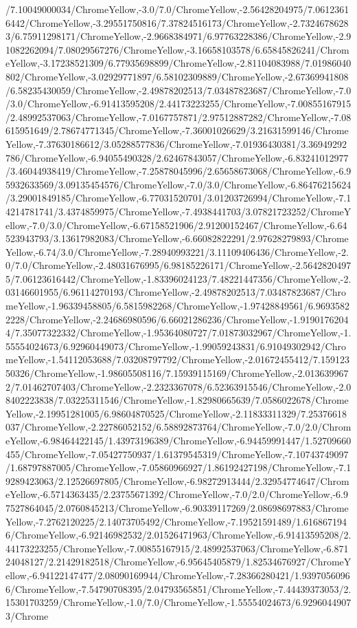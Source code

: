 {\begin{tikzternal}
/7.10049000034/ChromeYellow,-3.0/7.0/ChromeYellow,-2.56428204975/7.06123616442/ChromeYellow,-3.29551750816/7.37824516173/ChromeYellow,-2.73246786283/6.75911298171/ChromeYellow,-2.9668384971/6.97763228386/ChromeYellow,-2.91082262094/7.08029567276/ChromeYellow,-3.16658103578/6.65845826241/ChromeYellow,-3.17238521309/6.77935698899/ChromeYellow,-2.81104083988/7.01986040802/ChromeYellow,-3.02929771897/6.58102309889/ChromeYellow,-2.67369941808/6.58235430059/ChromeYellow,-2.49878202513/7.03487823687/ChromeYellow,-7.0/3.0/ChromeYellow,-6.91413595208/2.44173223255/ChromeYellow,-7.00855167915/2.48992537063/ChromeYellow,-7.0167757871/2.97512887282/ChromeYellow,-7.08615951649/2.78674771345/ChromeYellow,-7.36001026629/3.21631599146/ChromeYellow,-7.37630186612/3.05288577836/ChromeYellow,-7.01936430381/3.36949292786/ChromeYellow,-6.94055490328/2.62467843057/ChromeYellow,-6.83241012977/3.46044938419/ChromeYellow,-7.25878045996/2.65658673068/ChromeYellow,-6.95932633569/3.09135454576/ChromeYellow,-7.0/3.0/ChromeYellow,-6.86476215624/3.29001849185/ChromeYellow,-6.77031520701/3.01203726994/ChromeYellow,-7.14214781741/3.4374859975/ChromeYellow,-7.4938441703/3.07821723252/ChromeYellow,-7.0/3.0/ChromeYellow,-6.67158521906/2.91200152467/ChromeYellow,-6.64523943793/3.13617982083/ChromeYellow,-6.66082822291/2.97628279893/ChromeYellow,-6.74/3.0/ChromeYellow,-7.28940993221/3.11109406436/ChromeYellow,-2.0/7.0/ChromeYellow,-2.48031676995/6.98185226171/ChromeYellow,-2.56428204975/7.06123616442/ChromeYellow,-1.83396024123/7.48221447356/ChromeYellow,-2.03146601955/6.96114270193/ChromeYellow,-2.49878202513/7.03487823687/ChromeYellow,-1.96339458805/6.5815982268/ChromeYellow,-1.97428849561/6.96935822228/ChromeYellow,-2.24686980596/6.66021286236/ChromeYellow,-1.91901762044/7.35077322332/ChromeYellow,-1.95364080727/7.01873032967/ChromeYellow,-1.55554024673/6.92960449073/ChromeYellow,-1.99059243831/6.91049302942/ChromeYellow,-1.54112053688/7.03208797792/ChromeYellow,-2.01672455412/7.15912350326/ChromeYellow,-1.98605508116/7.15939115169/ChromeYellow,-2.0136399672/7.01462707403/ChromeYellow,-2.2323367078/6.52363915546/ChromeYellow,-2.08402223838/7.03225311546/ChromeYellow,-1.82980665639/7.0586022678/ChromeYellow,-2.19951281005/6.98604870525/ChromeYellow,-2.11833311329/7.25376618037/ChromeYellow,-2.22786052152/6.58892873764/ChromeYellow,-7.0/2.0/ChromeYellow,-6.98464422145/1.43973196389/ChromeYellow,-6.94459991447/1.52709660455/ChromeYellow,-7.05427750937/1.61379545319/ChromeYellow,-7.10743749097/1.68797887005/ChromeYellow,-7.05860966927/1.86192427198/ChromeYellow,-7.19289423063/2.12526697805/ChromeYellow,-6.98272913444/2.32954774647/ChromeYellow,-6.5714363435/2.23755671392/ChromeYellow,-7.0/2.0/ChromeYellow,-6.97527864045/2.0760845213/ChromeYellow,-6.90339117269/2.08698697883/ChromeYellow,-7.2762120225/2.14073705492/ChromeYellow,-7.19521591489/1.6168671946/ChromeYellow,-6.92146982532/2.01526471963/ChromeYellow,-6.91413595208/2.44173223255/ChromeYellow,-7.00855167915/2.48992537063/ChromeYellow,-6.87124048127/2.21429182518/ChromeYellow,-6.95645405879/1.82534676927/ChromeYellow,-6.94122147477/2.08090169944/ChromeYellow,-7.28366280421/1.93970560966/ChromeYellow,-7.54790708395/2.04793565851/ChromeYellow,-7.44439373053/2.15301703259/ChromeYellow,-1.0/7.0/ChromeYellow,-1.55554024673/6.92960449073/Chrome
\end{tikzternal}}
